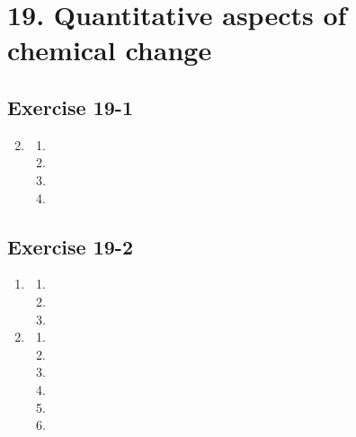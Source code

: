 \section{19. Quantitative aspects of chemical change}
\subsection{Exercise 19-1}
\begin{multicols}{4}
 \begin{enumerate}[noitemsep, label=\textbf{(\arabic*)} ]
\setcounter{enumi}{1}
  \item 
\begin{enumerate}[noitemsep, label=\textbf{(\alph*)} ]
 \item 
\item
\item
\item
\end{enumerate}
 \end{enumerate}
\end{multicols}

\subsection{Exercise 19-2}
\begin{multicols}{4}
 \begin{enumerate}[noitemsep, label=\textbf{(\arabic*)} ]
  \item 
\begin{enumerate}[noitemsep, label=\textbf{(\alph*)} ]
 \item 
\item
\item
\end{enumerate}
  \item 
\begin{enumerate}[noitemsep, label=\textbf{(\alph*)} ]
 \item 
\item
\item
\item
\item 
\item 
\end{enumerate}
 \end{enumerate}
\end{multicols}

